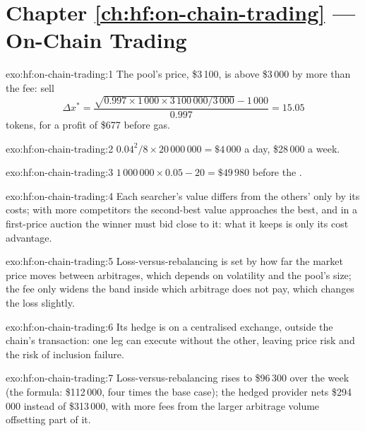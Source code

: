 \section*{Chapter \ref{ch:hf:on-chain-trading} --- On-Chain Trading}

\begin{solution}{exo:hf:on-chain-trading:1}
The pool's price, \$3\,100, is above \$3\,000 by more than the fee: sell
\[
\Delta x^\ast=\frac{\sqrt{0.997\times1\,000\times3\,100\,000/3\,000}-1\,000}{0.997}=15.05
\]
tokens, for a profit of \$677 before gas.
\end{solution}

\begin{solution}{exo:hf:on-chain-trading:2}
$0.04^2/8\times20\,000\,000=\$4\,000$ a day, \$28\,000 a week.
\end{solution}

\begin{solution}{exo:hf:on-chain-trading:3}
$1\,000\,000\times0.05-20=\$49\,980$ before the .
\end{solution}

\begin{solution}{exo:hf:on-chain-trading:4}
Each searcher's value differs from the others' only by its costs; with more competitors the second-best value approaches the best, and in a
first-price auction the winner must bid close to it: what it keeps is only its cost advantage.
\end{solution}

\begin{solution}{exo:hf:on-chain-trading:5}
Loss-versus-rebalancing is set by how far the market price moves between arbitrages, which depends on volatility and the pool's size; the fee only
widens the band inside which arbitrage does not pay, which changes the loss slightly.
\end{solution}

\begin{solution}{exo:hf:on-chain-trading:6}
Its hedge is on a centralised exchange, outside the chain's transaction: one leg can execute without the other, leaving price risk and the risk of
inclusion failure.
\end{solution}

\begin{solution}{exo:hf:on-chain-trading:7}
Loss-versus-rebalancing rises to \$96\,300 over the week (the formula: \$112\,000, four times the base case); the hedged provider nets \$294\,000
instead of \$313\,000, with more fees from the larger arbitrage volume offsetting part of it.
\end{solution}

